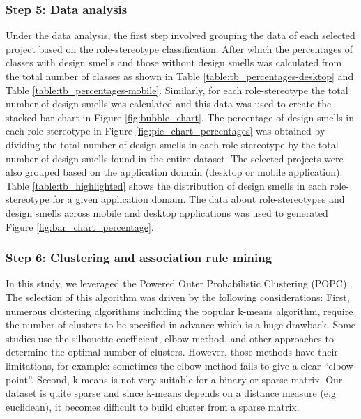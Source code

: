 \documentclass[AMA,Times1COL]{WileyNJDv5} %
\begin{document}
	\subsubsection*{Step 5: Data analysis}
	Under the data analysis, the first step involved grouping the data of each selected project based on the role-stereotype classification. After which the percentages of classes with design smells and those without design smells was calculated from the total number of classes as shown in Table \ref{table:tb_percentages-desktop} and Table \ref{table:tb_percentages-mobile}. 
	Similarly, for each role-stereotype the total number of design smells was calculated and this data was used to create the stacked-bar chart in Figure \ref{fig:bubble_chart}. The percentage of design smells in each role-stereotype in Figure \ref{fig:pie_chart_percentages} was obtained by dividing the total number of design smells in each role-stereotype by the total number of design smells found in the entire dataset. The selected projects were also grouped based on the application domain (desktop or mobile application). Table \ref{table:tb_highlighted} shows the distribution of design smells in each role-stereotype for a given application domain. The data about role-stereotypes and design smells across mobile and desktop applications was used to generated Figure \ref{fig:bar_chart_percentage}.
	
	
	\subsubsection*{Step 6: Clustering and association rule mining}
	In this study, we leveraged the Powered Outer Probabilistic Clustering (POPC) \cite{taraba2017clustering}. The selection of this algorithm was driven by the following considerations: First, numerous clustering algorithms including the popular k-means algorithm, require the number of clusters to be specified in advance which is a huge drawback. Some studies use the silhouette coefficient, elbow method, and other approaches to determine the optimal number of clusters. However, those methods have their limitations, for example: sometimes the elbow method fails to give a clear ``elbow point”. Second, k-means is not very suitable for a binary or sparse matrix. Our dataset is quite sparse and since k-means depends on a distance measure (e.g euclidean), it becomes difficult to build cluster from a sparse matrix. 
	
\end{document}
